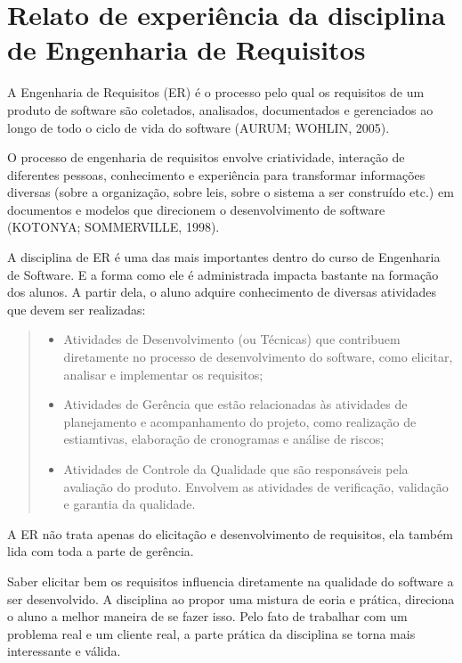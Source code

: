 \section[Relato de experiência da disciplina de Engenharia de Requisitos]{Relato de experiência da disciplina de Engenharia de Requisitos}
A Engenharia de Requisitos (ER) é o processo pelo qual os requisitos de um produto de software são coletados, analisados, documentados e gerenciados ao longo de todo o ciclo de vida do software (AURUM; WOHLIN, 2005).

O processo de engenharia de requisitos envolve criatividade, interação de diferentes pessoas, conhecimento e experiência para transformar informações diversas (sobre a organização, sobre leis, sobre o sistema a ser construído etc.) em documentos e modelos que direcionem o desenvolvimento de software (KOTONYA; SOMMERVILLE, 1998). 

A disciplina de ER é uma das mais importantes dentro do curso de Engenharia de Software. E a forma como ele é administrada impacta bastante
na formação dos alunos. A partir dela, o aluno adquire conhecimento de diversas atividades que devem ser realizadas:

\begin{quote} 
	\begin{itemize}
        \item Atividades de Desenvolvimento (ou Técnicas) que contribuem diretamente no processo de desenvolvimento do software, como elicitar, analisar e implementar os requisitos;
        \item Atividades de Gerência que estão relacionadas às atividades de planejamento e acompanhamento do projeto, como realização de estiamtivas, elaboração de cronogramas e análise de riscos;
        \item Atividades de Controle da Qualidade que são responsáveis pela avaliação do produto. Envolvem as atividades de verificação, validação e garantia da qualidade.
    \end{itemize}
\end{quote}

A ER não trata apenas do elicitação e desenvolvimento de
requisitos, ela também lida com toda a parte de gerência.

Saber elicitar bem os requisitos influencia diretamente na qualidade do software a ser desenvolvido. A disciplina ao propor uma mistura de eoria e prática, direciona o aluno a melhor maneira de se fazer isso. Pelo fato de trabalhar com um problema real e um cliente real, a parte prática da disciplina se torna mais interessante e válida.
